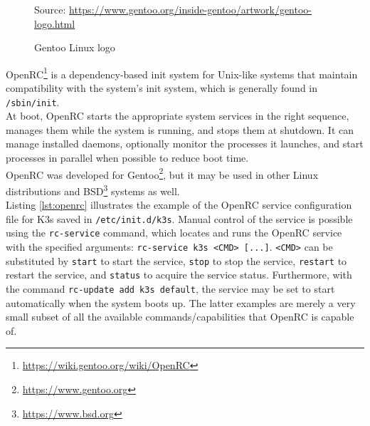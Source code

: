 \begin{figure} %
  \centering
  \def\stackalignment{r} %
  {\scriptsize \parbox[t]{\linewidth}{ Source: \url{https://www.gentoo.org/inside-gentoo/artwork/gentoo-logo.html}} }
  \caption{Gentoo Linux logo}
\end{figure}

OpenRC\footnote{\url{https://wiki.gentoo.org/wiki/OpenRC}} is a dependency-based
init system for Unix-like systems that maintain compatibility with the system's
init system, which is generally found in \texttt{/sbin/init}. \\ %
At boot, OpenRC starts the appropriate system services in the right sequence, manages
them while the system is running, and stops them at shutdown. It can manage installed
daemons, optionally monitor the processes it launches, and start processes in parallel
when possible to reduce boot time. \\ %
OpenRC was developed for Gentoo\footnote{\url{https://www.gentoo.org}}, but it
may be used in other Linux distributions and BSD\footnote{\url{https://www.bsd.org}}
systems as well. \\ %
Listing \ref{lst:openrc} illustrates the example of the OpenRC service
configuration file for K3s saved in \texttt{/etc/init.d/k3s}. Manual control of the
service is possible using the \texttt{rc-service} command, which locates and runs
the OpenRC service with the specified arguments: \texttt{rc-service k3s <CMD> [...]}.
\texttt{<CMD>} can be substituted by \texttt{start} to start the service, \texttt{stop}
to stop the service, \texttt{restart} to restart the service, and \texttt{status}
to acquire the service status. Furthermore, with the command \texttt{rc-update
add k3s default}, the service may be set to start automatically when the system
boots up. The latter examples are merely a very small subset of all the available
commands/capabilities that OpenRC is capable of.

